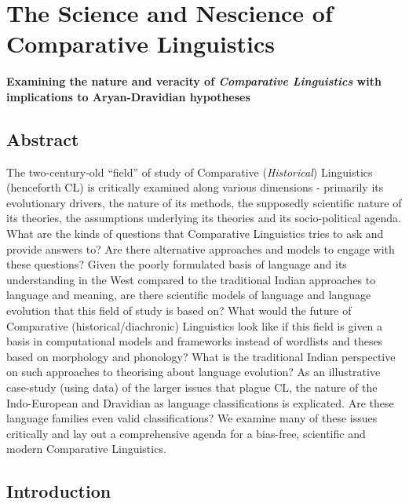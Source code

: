 
\chapter{The Science and Nescience of Comparative Linguistics}\label{intro}

\begin{center}
\textbf{Examining the nature and veracity of \textit{Comparative Linguistics} with implications to Aryan-Dravidian hypotheses}
\end{center}



\section*{Abstract}

The two-century-old “field” of study of Comparative (\textit{Historical}) Linguistics (henceforth CL) is critically examined along various dimensions - primarily its evolutionary drivers, the nature of its methods, the supposedly scientific nature of its theories, the assumptions underlying its theories and its socio-political agenda. What are the kinds of questions that Comparative Linguistics tries to ask and provide answers to? Are there alternative approaches and models to engage with these questions? Given the poorly formulated basis of language and its understanding in the West compared to the traditional Indian approaches to language and meaning, are there scientific models of language and language evolution that this field of study is based on? What would the future of Comparative (historical/diachronic) Linguistics look like if this field is given a basis in computational models and frameworks instead of wordlists and theses based on morphology and phonology? What is the traditional Indian perspective on such approaches to theorising about language evolution? As an illustrative case-study (using data) of the larger issues that plague CL, the nature of the Indo-European and Dravidian as language classifications is explicated. Are these language families even valid classifications? We examine many of these issues critically and lay out a comprehensive agenda for a bias-free, scientific and modern Comparative Linguistics.


\section*{Introduction}

\vskip 6pt

